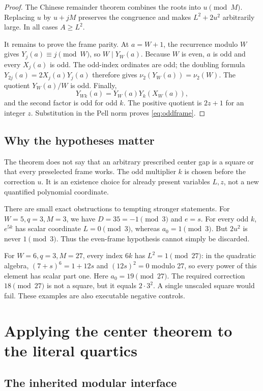 \documentclass[10pt,letterpaper]{article}
\theoremstyle{definition}\newtheorem{definition}[theorem]{Definition}
\theoremstyle{remark}\newtheorem{remark}[theorem]{Remark}
\begin{document}
\begin{proof}
The Chinese remainder theorem combines the roots into $u\pmod M$.
Replacing $u$ by $u+jM$ preserves the congruence and makes
$L^2+2u^2$ arbitrarily large. In all cases $A\ge L^2$.

It remains to prove the frame parity. At $a=W+1$, the recurrence modulo
$W$ gives $Y_j(a)\equiv j\pmod W$, so $W\mid Y_W(a)$. Because $W$
is even, $a$ is odd and every $X_j(a)$ is odd. The odd-index ordinates
are odd; the doubling formula
$Y_{2j}(a)=2X_j(a)Y_j(a)$ therefore gives
$\nu_2(Y_W(a))=\nu_2(W)$. The quotient $Y_W(a)/W$ is odd. Finally,
\[
 Y_{Wk}(a)=Y_W(a)Y_k(X_W(a)),
\]
and the second factor is odd for odd $k$. The positive quotient is
$2z+1$ for an integer $z$. Substitution in the Pell norm proves
\eqref{eq:oddframe}.
\end{proof}

\subsection{Why the hypotheses matter}

The theorem does not say that an arbitrary prescribed center gap is a
square or that every preselected frame works. The odd multiplier $k$
is chosen before the correction $u$. It is an existence choice for
already present variables $L,z$, not a new quantified polynomial
coordinate.

There are small exact obstructions to tempting stronger statements.
For $W=5,q=3,M=3$, we have $D=35=-1\pmod3$ and $e=s$. For every
odd $k$, $e^{5k}$ has scalar coordinate $L=0\pmod3$, whereas
$a_0=1\pmod3$. But $2u^2$ is never $1\pmod3$. Thus the even-frame
hypothesis cannot simply be discarded.

For $W=6,q=3,M=27$, every index $6k$ has $L^2=1\pmod{27}$:
in the quadratic algebra, $(7+s)^6=1+12s$ and $(12s)^2=0$ modulo 27,
so every power of this element has scalar part one.
Here $a_0=19\pmod{27}$. The required correction $18\pmod{27}$
is not a square, but it equals $2\cdot3^2$. A single unscaled square
would fail. These examples are also executable negative controls.

\section{Applying the center theorem to the literal quartics}

\subsection{The inherited modular interface}
\end{document}
